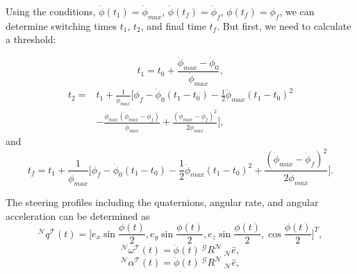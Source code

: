 \documentclass[letterpaper, paper,12pt]{AAS}		%
\begin{document}
	
	 Using the conditions, $\dot{\phi}(t_1)=\dot{\phi}_{max}$, $\dot{\phi}(t_f)=\dot{\phi}_f$, $\phi(t_f)=\phi_f$, we can determine switching times $t_1$, $t_2$, and final time $t_f$. But first, we need to calculate a threshold:
	
	\begin{equation}\label{t1cons}
	t_1=t_0+\frac{\dot{\phi}_{max}-\dot{\phi}_0}{\ddot{\phi}_{max}},
	\end{equation}
	\begin{equation}\label{t2cons}
	\begin{split}
	t_2=&t_1+\frac{1}{\dot{\phi}_{max}}\Big[ \phi_f-\dot{\phi}_0(t_1-t_0)-\frac{1}{2}\ddot{\phi}_{max}(t_1-t_0)^2\\
	&-\frac{\dot{\phi}_{max}(\dot{\phi}_{max}-\dot{\phi}_f)}{\ddot{\phi}_{max}}+\frac{(\dot{\phi}_{max}-\dot{\phi}_f)^2}{2\ddot{\phi}_{max}} \Big],
	\end{split}
	\end{equation}
	and
	\begin{equation}\label{tfcons}
	t_f=t_1+\frac{1}{\dot{\phi}_{max}}\Big[ \phi_f-\dot{\phi}_0(t_1-t_0)-\frac{1}{2}\ddot{\phi}_{max}(t_1-t_0)^2+\frac{(\dot{\phi}_{max}-\dot{\phi}_f)^2}{2\ddot{\phi}_{max}} \Big].
	\end{equation}
	
	
	
		The steering profiles including the quaternions, angular rate, and angular acceleration can be determined as
		\begin{equation}\label{quatT}
		^\mathcal{N}q^\mathcal{T}(t)=\Big[e_x\sin\frac{\phi(t)}{2}, e_y\sin\frac{\phi(t)}{2}, e_z\sin\frac{\phi(t)}{2}, \cos\frac{\phi(t)}{2}\Big]^T,
		\end{equation}
		\begin{equation}\label{omegaT}
		^\mathcal{N}\omega^\mathcal{T}(t)=\dot{\phi}(t)\ ^\mathcal{G}R^\mathcal{N}\ _\mathcal{N}\hat{e},
		\end{equation}
		\begin{equation}\label{alpha_1}
		^\mathcal{N}\alpha^\mathcal{T}(t)=\ddot{\phi}(t)\ ^\mathcal{G}R^\mathcal{N}\ _\mathcal{N}\hat{e},
		\end{equation}
\end{document}
